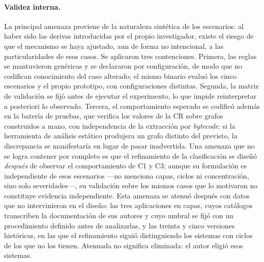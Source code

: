 \paragraph{Validez interna.} La principal amenaza proviene de la naturaleza sintética de los escenarios: al haber sido las derivas introducidas por el propio investigador, existe el riesgo de que el mecanismo se haya ajustado, aun de forma no intencional, a las particularidades de esos casos. Se aplicaron tres contenciones. Primera, las reglas se mantuvieron genéricas y se declararon por configuración, de modo que no codifican conocimiento del caso alterado; el mismo binario evaluó los cinco escenarios y el propio prototipo, con configuraciones distintas. Segunda, la matriz de validación se fijó antes de ejecutar el experimento, lo que impide reinterpretar a posteriori lo observado. Tercera, el comportamiento esperado se codificó además en la batería de pruebas, que verifica los valores de la CR sobre grafos construidos a mano, con independencia de la extracción por \textit{bytecode}: si la herramienta de análisis estático produjera un grafo distinto del previsto, la discrepancia se manifestaría en lugar de pasar inadvertida. Una amenaza que no se logra contener por completo es que el refinamiento de la clasificación se diseñó \textit{después} de observar el comportamiento de C1 y C3; aunque su formulación es independiente de esos escenarios ---no menciona capas, ciclos ni concentración, sino solo severidades---, su validación sobre los mismos casos que lo motivaron no constituye evidencia independiente. Esta amenaza se atenuó después con datos que no intervinieron en el diseño: las tres aplicaciones en capas, cuyos catálogos transcriben la documentación de sus autores y cuyo umbral se fijó con un procedimiento definido antes de analizarlas, y las treinta y cinco versiones históricas, en las que el refinamiento siguió distinguiendo los sistemas con ciclos de los que no los tienen. Atenuada no significa eliminada: el autor eligió esos sistemas.

